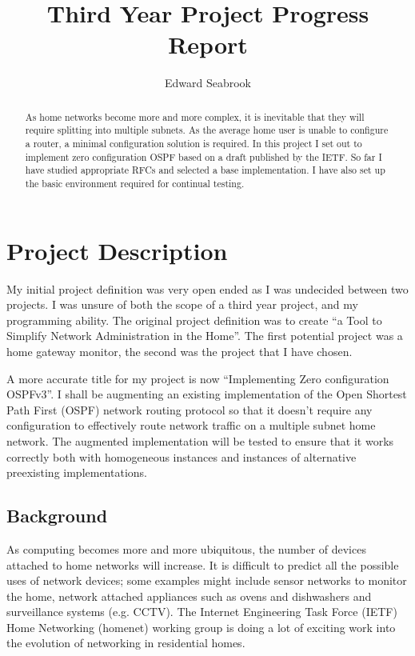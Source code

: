 \documentclass[12pt]{report}
\author{Edward Seabrook}
\title{Third Year Project Progress Report}
\begin{document}


\begin{abstract}
As home networks become more and more complex, it is inevitable that they will
require splitting into multiple subnets. As the average home user is unable to
configure a router, a minimal configuration solution is required. In this
project I set out to implement zero configuration OSPF based on a draft
published by the IETF. So far I have studied appropriate RFCs and selected a
base implementation. I have also set up the basic environment required for
continual testing.
\end{abstract}

\tableofcontents
\clearpage

\chapter{Project Description}
My initial project definition was very open ended as I was undecided between
two projects. I was unsure of both the scope of a third year project, and my
programming ability. The original project definition was to create
``a Tool to Simplify Network Administration in the Home''. The first potential
project was a home gateway monitor, the second was the project that
I have chosen. 

A more accurate title for my project is now ``Implementing Zero configuration
OSPFv3''. I shall be augmenting an existing implementation of the Open Shortest
Path First (OSPF) network routing protocol so that it doesn't require any
configuration to effectively route network traffic on a multiple subnet home
network. The augmented implementation will be tested to ensure that it works
correctly both with homogeneous instances and instances of alternative
preexisting implementations. 

\section{Background}
As computing becomes more and more ubiquitous, the number of devices attached to
home networks will increase. It is difficult to predict all the possible uses of
network devices; some examples might include sensor networks to monitor the
home, network attached appliances such as ovens and dishwashers and surveillance
systems (e.g. CCTV). The Internet Engineering Task Force (IETF) Home Networking
(homenet) working group is doing a lot of exciting work into the evolution of
networking in residential homes. 
\end{document}
